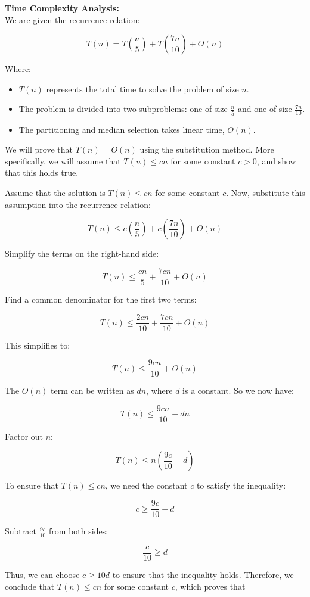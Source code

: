 \documentclass[a4paper,12pt]{report}
\begin{document}
\large \textbf{Time Complexity Analysis:} \hfill \\

We are given the recurrence relation:

\[
T(n) = T\left(\frac{n}{5}\right) + T\left(\frac{7n}{10}\right) + O(n) \tag{9.1}
\]

Where:
\begin{itemize}
    \item $T(n)$ represents the total time to solve the problem of size $n$.
    \item The problem is divided into two subproblems: one of size $\frac{n}{5}$ and one of size $\frac{7n}{10}$.
    \item The partitioning and median selection takes linear time, $O(n)$.
\end{itemize}

We will prove that $T(n) = O(n)$ using the substitution method. More specifically, we will assume that $T(n) \leq cn$ for some constant $c > 0$, and show that this holds true.

Assume that the solution is $T(n) \leq cn$ for some constant $c$. Now, substitute this assumption into the recurrence relation:

\[
T(n) \leq c\left(\frac{n}{5}\right) + c\left(\frac{7n}{10}\right) + O(n)
\]

Simplify the terms on the right-hand side:

\[
T(n) \leq \frac{cn}{5} + \frac{7cn}{10} + O(n)
\]

Find a common denominator for the first two terms:

\[
T(n) \leq \frac{2cn}{10} + \frac{7cn}{10} + O(n)
\]

This simplifies to:

\[
T(n) \leq \frac{9cn}{10} + O(n)
\]

The $O(n)$ term can be written as $dn$, where $d$ is a constant. So we now have:

\[
T(n) \leq \frac{9cn}{10} + dn
\]

Factor out $n$:

\[
T(n) \leq n \left(\frac{9c}{10} + d\right)
\]

To ensure that $T(n) \leq cn$, we need the constant $c$ to satisfy the inequality:

\[
c \geq \frac{9c}{10} + d
\]

Subtract $\frac{9c}{10}$ from both sides:

\[
\frac{c}{10} \geq d
\]

Thus, we can choose $c \geq 10d$ to ensure that the inequality holds. Therefore, we conclude that $T(n) \leq cn$ for some constant $c$, which proves that 
\newline
\end{document}
